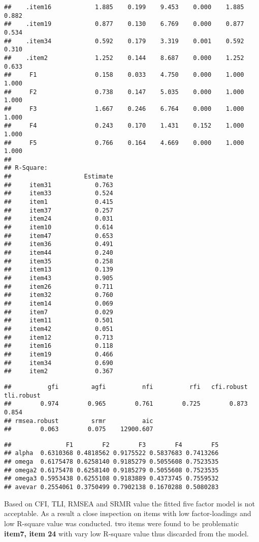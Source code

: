 \documentclass[
  english,
  man]{apa6}
\begin{document}
\begin{verbatim}
##    .item16            1.885    0.199    9.453    0.000    1.885    0.882
##    .item19            0.877    0.130    6.769    0.000    0.877    0.534
##    .item34            0.592    0.179    3.319    0.001    0.592    0.310
##    .item2             1.252    0.144    8.687    0.000    1.252    0.633
##     F1                0.158    0.033    4.750    0.000    1.000    1.000
##     F2                0.738    0.147    5.035    0.000    1.000    1.000
##     F3                1.667    0.246    6.764    0.000    1.000    1.000
##     F4                0.243    0.170    1.431    0.152    1.000    1.000
##     F5                0.766    0.164    4.669    0.000    1.000    1.000
## 
## R-Square:
##                    Estimate
##     item31            0.763
##     item33            0.524
##     item1             0.415
##     item37            0.257
##     item24            0.031
##     item10            0.614
##     item47            0.653
##     item36            0.491
##     item44            0.240
##     item35            0.258
##     item13            0.139
##     item43            0.905
##     item26            0.711
##     item32            0.760
##     item14            0.069
##     item7             0.029
##     item11            0.501
##     item42            0.051
##     item12            0.713
##     item16            0.118
##     item19            0.466
##     item34            0.690
##     item2             0.367
\end{verbatim}

\begin{verbatim}
##          gfi         agfi          nfi          rfi   cfi.robust   tli.robust 
##        0.974        0.965        0.761        0.725        0.873        0.854 
## rmsea.robust         srmr          aic 
##        0.063        0.075    12900.607
\end{verbatim}

\begin{verbatim}
##               F1        F2        F3        F4        F5
## alpha  0.6310368 0.4818562 0.9175522 0.5837683 0.7413266
## omega  0.6175478 0.6258140 0.9185279 0.5055608 0.7523535
## omega2 0.6175478 0.6258140 0.9185279 0.5055608 0.7523535
## omega3 0.5953438 0.6255108 0.9183889 0.4373745 0.7559532
## avevar 0.2554061 0.3750499 0.7902138 0.1670288 0.5080283
\end{verbatim}

Based on CFI, TLI, RMSEA and SRMR value the fitted five factor model is not acceptable.
As a result a close inspection on items with low factor-loadings and low R-square value was conducted. two items were found to be problematic \textbf{item7, item 24} with vary low R-square
value thus discarded from the model.
\end{document}

